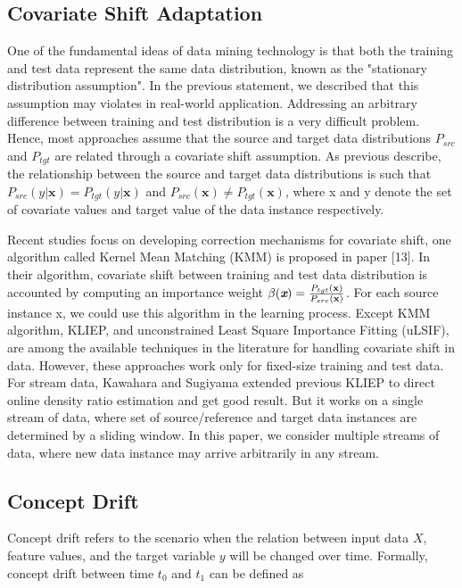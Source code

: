\documentclass[conference,compsoc]{IEEEtran}
\begin{document}
\subsection{Covariate Shift Adaptation}
\label{notations}
One of the fundamental ideas of data mining technology is that both the training and test data 
represent the same data distribution, known as the "stationary
distribution assumption". In the previous statement, we described that this assumption may violates in real-world application. Addressing an arbitrary difference between training and test distribution is a very difficult problem\cite{Huang}. Hence, most approaches assume that the source and target data distributions $P_{src}$ and $P_{tgt}$ are related through a covariate shift assumption. As previous describe, the relationship between the source and target data distributions is such that $P_{src}(y \vert {\textbf{x}}) = P_{tgt}(y \vert {\textbf{x}})$ and $P_{src}(\textbf{x}) \ne P_{tgt}(\textbf{x})$, where x and y denote the
set of covariate values and target value of the data instance respectively.

Recent studies focus on developing correction mechanisms for covariate shift, one algorithm called Kernel Mean Matching (KMM) is proposed in paper [13]. In their algorithm, 
covariate shift between training and test data distribution is accounted by 
computing an importance weight $\beta(\textit{\textbf{x}}) = \frac{P_{tgt}({\textbf{x}})}
{P_{src}({\textbf{x}})}$. For each source instance x, we could use this algorithm in the learning process. Except KMM algorithm, KLIEP\cite{sugiyama}, and unconstrained Least Square Importance Fitting (uLSIF)\cite{kanamori}, are among the available techniques  in the literature for handling covariate shift in data. However, these 
approaches work only for fixed-size training and test data. For stream data, Kawahara 
and Sugiyama\cite{kawahara} extended previous KLIEP to direct online density ratio 
estimation and get good result. But it works on a single stream of data, where set 
of source/reference and target data instances are determined by a sliding window. In 
this paper, we consider multiple streams of data, where new data instance may arrive 
arbitrarily in any stream.


\subsection{Concept Drift}
\label{notations}
  Concept drift refers to the scenario when the relation between input data $X$, feature values, and the target variable $y$ will be changed over time. Formally, concept drift between time $t_0$ and $t_1$ can be defined as
\end{document}
